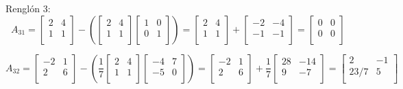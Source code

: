 \documentclass{article}
\begin{document}
Renglón 3: 
$$ A_{31} = \begin{bmatrix}
    2 & 4 \\
    1 & 1 \\
\end{bmatrix} - (\begin{bmatrix}
    2 & 4 \\
    1 & 1 \\
\end{bmatrix}\begin{bmatrix}
    1 & 0 \\
    0 & 1 \\
\end{bmatrix}) = \begin{bmatrix}
    2 & 4 \\
    1 & 1 \\
\end{bmatrix} + \begin{bmatrix}
    -2 & -4 \\
    -1 & -1 \\
\end{bmatrix} = \begin{bmatrix}
    0 & 0 \\
    0 & 0 \\
\end{bmatrix}$$

$$A_{32} = \begin{bmatrix}
    -2 & 1 \\
    2 & 6 \\
\end{bmatrix} - (\frac{1}{7}\begin{bmatrix}
    2 & 4 \\
    1 & 1 \\
\end{bmatrix} \begin{bmatrix}
    -4 & 7 \\
    -5 & 0 \\
\end{bmatrix}) = \begin{bmatrix}
    -2 & 1 \\
    2 & 6 \\
\end{bmatrix} + \frac{1}{7}\begin{bmatrix}
    28 & -14 \\
    9 & -7 \\
\end{bmatrix} = \begin{bmatrix}
    2 & -1 \\
    23/7 & 5 \\
\end{bmatrix}$$
\end{document}
